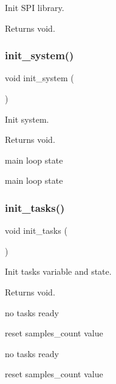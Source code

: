Init S\+PI library. 

\begin{DoxyReturn}{Returns}
void. 
\end{DoxyReturn}
\mbox{\label{i2c-th_8h_a348d23d5899ce59d18975284dfb0afc0}} 
\subsubsection{\texorpdfstring{init\+\_\+system()}{init\_system()}}
{\footnotesize\ttfamily void init\+\_\+system (\begin{DoxyParamCaption}{ }\end{DoxyParamCaption})}



Init system. 

\begin{DoxyReturn}{Returns}
void. 
\end{DoxyReturn}
main loop state

main loop state \mbox{\label{i2c-th_8h_a2aae2290a141fddcea3fb6009acbb445}} 
\subsubsection{\texorpdfstring{init\+\_\+tasks()}{init\_tasks()}}
{\footnotesize\ttfamily void init\+\_\+tasks (\begin{DoxyParamCaption}{ }\end{DoxyParamCaption})}



Init tasks variable and state. 

\begin{DoxyReturn}{Returns}
void. 
\end{DoxyReturn}
no tasks ready

reset samples\+\_\+count value

no tasks ready

reset samples\+\_\+count value \mbox{\label{i2c-th_8h_a980e73df66b14b1190bc25da430a4f12}} 
